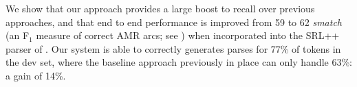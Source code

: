 \documentclass[11pt]{article}
\newcommand\n[1]{\textit{#1}} %
\begin{document}
We show that our approach provides a large boost to recall over previous approaches, and that end to end performance is improved from 59 to 62 \n{smatch} (an F$_1$ measure of correct AMR arcs; see \cite{cai2013smatch-amr}) when incorporated into the SRL++ parser of .
Our system is able to correctly generates parses for 77\% of tokens in the dev set, where the baseline approach previously in place can only handle 63\%: a gain of 14\%.





\end{document}

